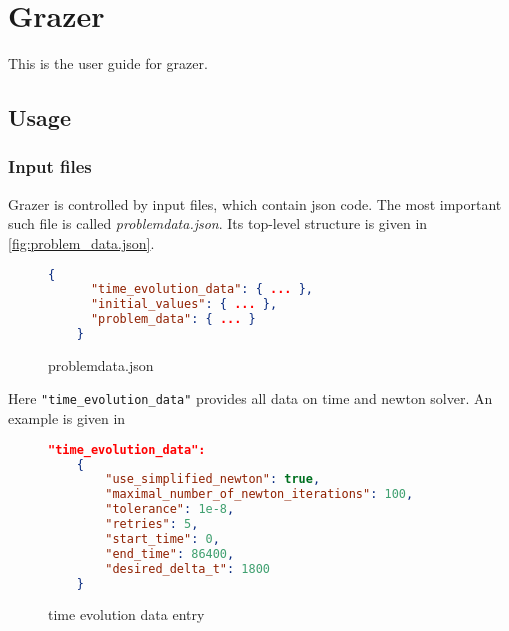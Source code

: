 \documentclass[a4paper]{article}
\newcommand{\sco
}{\textunderscore{}}
\begin{document}
\section{Grazer}
\label{sec:grazer}
This is the user guide for grazer.

\subsection{Usage}
\label{sec:usage}

\subsubsection{Input files}
\label{sec:input-files}
Grazer is controlled by input files, which contain json code.
The most important such file is called \emph{problem\sco data.json}. Its top-level structure is given in \autoref{fig:problem_data.json}.

\begin{figure}[ht]
  \centering
  \begin{lstlisting}[language=json,firstnumber=1]
    {
      "time_evolution_data": { ... },
      "initial_values": { ... },
      "problem_data": { ... }
    }
  \end{lstlisting}
  \caption{problem\sco data.json}
  \label{fig:problem_data.json}
\end{figure}
Here \verb|"time_evolution_data"| provides all data on time and newton solver. An example is given in

\begin{figure}[ht]
  \centering
\begin{lstlisting}[language=json,firstnumber=1]
    "time_evolution_data":
    {
        "use_simplified_newton": true,
        "maximal_number_of_newton_iterations": 100,
        "tolerance": 1e-8,
        "retries": 5,
        "start_time": 0,
        "end_time": 86400,
        "desired_delta_t": 1800
    }
\end{lstlisting}
  \caption{time evolution data entry}
  \label{fig:time_evolution_data}
\end{figure}
\end{document}
